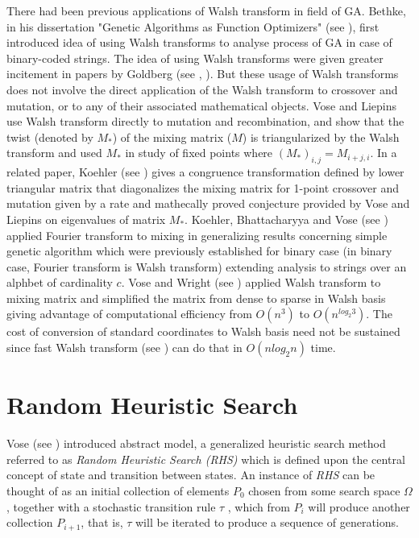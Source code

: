 There had been previous applications of Walsh transform in field of GA. Bethke, in his dissertation 
"Genetic Algorithms as Function Optimizers" (see \cite{Bethke1981}), first introduced 
idea of using Walsh transforms to analyse process of GA in case of binary-coded strings. The idea of using Walsh transforms 
were given greater incitement in papers by Goldberg (see \cite{Goldberg1989a}, \cite{Goldberg1989b}). But these usage of 
Walsh transforms does not involve the direct application of the Walsh transform to crossover and mutation, or to any of their 
associated mathematical objects. Vose and Liepins use Walsh transform directly to mutation and recombination, and show that the 
twist (denoted by $M_*$) of the mixing matrix ($M$) is triangularized by the Walsh transform and used $M_*$ in study of fixed points where $(M_*)_{i,j} = M_{i+j, i}$. In a related paper, Koehler (see \cite{Koehler1994}) gives a congruence 
transformation defined by lower triangular matrix that diagonalizes the mixing matrix for 1-point crossover and mutation given by a rate and mathecally proved conjecture provided by Vose and Liepins on eigenvalues of matrix $M_*$. Koehler, Bhattacharyya and Vose (see \cite{KoehlerBhatta1997}) applied Fourier transform to mixing in generalizing results concerning simple genetic algorithm which were previously established for binary case (in binary case, Fourier transform is Walsh transform) extending analysis to strings over an alphbet of cardinality $c$. Vose and Wright (see \cite{VoseWright1998}) applied Walsh transform to mixing matrix and simplified the matrix from dense to sparse in Walsh basis giving advantage of computational efficiency from $O(n^3)$ to $O(n^{log_2 3})$. The cost of conversion of standard coordinates to Walsh basis need not be sustained since fast Walsh transform (see \cite{Shanks1969}) can do that in $O(n log_2 n)$ time.

\section{Random Heuristic Search}
Vose (see \cite{Vose1999}) introduced abstract model, a generalized heuristic search method referred to as {\em Random Heuristic Search (RHS)} which is defined upon the central concept of state and transition between states. An instance of {\em RHS} can be thought of as an initial collection of elements $P_0$ chosen from some search space $\Omega$ , together with a stochastic transition rule $\tau$ , which from $P_i$ will produce another collection $P_{i+1}$, that is, $\tau$ will be iterated to produce a sequence of generations.

